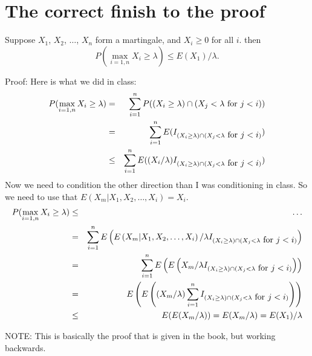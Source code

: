 \documentclass[12pt]{article}
\begin{document}
\section*{The correct finish to the proof}

Suppose $X_1$, $X_2$, $\ldots$, $X_n$ form a martingale, and $X_i \ge
0$ for all $i$.  then 
\begin{displaymath}
P(\max_{i=1,n} X_i \ge \lambda) \le E(X_1)/\lambda.
\end{displaymath}

Proof:
Here is what we did in class:
\begin{eqnarray*}
P(\max_{i=1,n} X_i \ge \lambda) 
& = & \sum_{i=1}^n P((X_i \ge \lambda) \cap (X_j < \lambda \hbox{ for $j < i$})) \\ 
& = & \sum_{i=1}^n E(I_{(X_i \ge \lambda) \cap (X_j < \lambda \hbox{ for $j < i$})}) \\ 
& \le & \sum_{i=1}^n E((X_i/\lambda) I_{(X_i \ge \lambda) \cap (X_j <
\lambda \hbox{ for $j < i$})}) 
\end{eqnarray*}
Now we need to condition the other direction than I was conditioning
in class.  So we need to use that $E(X_m|X_1,X_2,\ldots,X_i) = X_i$.
\begin{eqnarray*}
P(\max_{i=1,n} X_i \ge \lambda) &\le & \ldots \\
& = & \sum_{i=1}^n E\left(E\left(X_m|X_1,X_2,\ldots,X_i\right)/\lambda I_{(X_i \ge \lambda) \cap (X_j <
\lambda \hbox{ for $j < i$})}\right) \\
& = & \sum_{i=1}^n E\left(E\left(X_m/\lambda I_{(X_i \ge \lambda) \cap (X_j <
\lambda \hbox{ for $j < i$})}\right)\right) \\
& = &  E\left(E\left((X_m/\lambda) \sum_{i=1}^n  I_{(X_i \ge \lambda) \cap (X_j <
\lambda \hbox{ for $j < i$})}\right)\right) \\
& \le &  E(E(X_m/\lambda))  =  E(X_m/\lambda) = E(X_1)/\lambda
\end{eqnarray*}

NOTE: This is basically the proof that is given in the book, but
working backwards.
\end{document}
